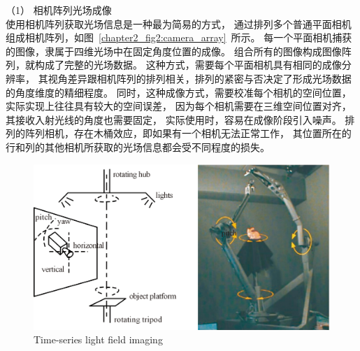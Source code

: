 （1）
相机阵列光场成像
\\
%
%
%
%
\indent
%
%
%
使用相机阵列获取光场信息是一种最为简易的方式，
通过排列多个普通平面相机组成相机阵列，如图~\ref{chapter2_fig2:camera_array}~所示。
每一个平面相机捕获的图像，隶属于四维光场中在固定角度位置的成像。
组合所有的图像构成图像阵列，就构成了完整的光场数据。
这种方式，需要每个平面相机具有相同的成像分辨率，
其视角差异跟相机阵列的排列相关，排列的紧密与否决定了形成光场数据的角度维度的精细程度。
同时，这种成像方式，需要校准每个相机的空间位置，实际实现上往往具有较大的空间误差，
因为每个相机需要在三维空间位置对齐，其接收入射光线的角度也需要固定，
实际使用时，容易在成像阶段引入噪声。
排列的阵列相机，存在木桶效应，即如果有一个相机无法正常工作，
其位置所在的行和列的其他相机所获取的光场信息都会受不同程度的损失。
\begin{figure}[t]
	\centering
	\includegraphics[width=0.75\linewidth]{figures/chapter2/time_seq2}
	{Time-series light field imaging}  
	\label{chapter2_fig3:time_seq2}
\end{figure}
\\
%
%
%
%
\indent

